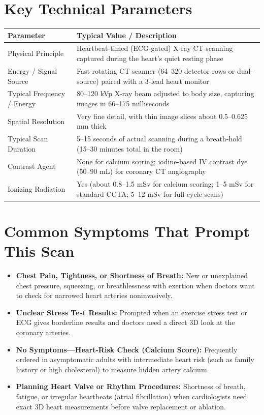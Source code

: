 \section{Key Technical Parameters}
\noindent
\begin{tabularx}{\textwidth}{@{}l X@{}}
\toprule
\textbf{Parameter} & \textbf{Typical Value / Description} \\
\midrule
Physical Principle & Heartbeat-timed (ECG-gated) X-ray CT scanning captured during the heart's quiet resting phase \\
Energy / Signal Source & Fast-rotating CT scanner (64--320 detector rows or dual-source) paired with a 3-lead heart monitor \\
Typical Frequency / Energy & 80--120 kVp X-ray beam adjusted to body size, capturing images in 66--175 milliseconds \\
Spatial Resolution & Very fine detail, with thin image slices about 0.5--0.625 mm thick \\
Typical Scan Duration & 5--15 seconds of actual scanning during a breath-hold (15--30 minutes total in the room) \\
Contrast Agent & None for calcium scoring; iodine-based IV contrast dye (50--90 mL) for coronary CT angiography \\
Ionizing Radiation & Yes (about 0.8--1.5 mSv for calcium scoring; 1--5 mSv for standard CCTA; 5--12 mSv for full-cycle scans) \\
\bottomrule
\end{tabularx}

\section{Common Symptoms That Prompt This Scan}
\begin{itemize}
    \item \textbf{Chest Pain, Tightness, or Shortness of Breath:} New or unexplained chest pressure, squeezing, or breathlessness with exertion when doctors want to check for narrowed heart arteries noninvasively.
    \item \textbf{Unclear Stress Test Results:} Prompted when an exercise stress test or ECG gives borderline results and doctors need a direct 3D look at the coronary arteries.
    \item \textbf{No Symptoms---Heart-Risk Check (Calcium Score):} Frequently ordered in asymptomatic adults with intermediate heart risk (such as family history or high cholesterol) to measure hidden artery calcium.
    \item \textbf{Planning Heart Valve or Rhythm Procedures:} Shortness of breath, fatigue, or irregular heartbeats (atrial fibrillation) when cardiologists need exact 3D heart measurements before valve replacement or ablation.
\end{itemize}


